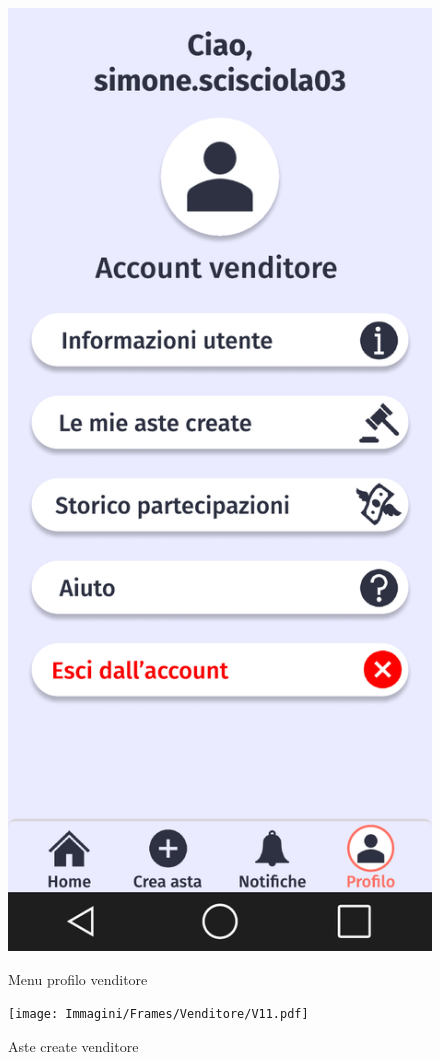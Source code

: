 \begin{figure}[!htb]
\begin{minipage}{0.32\textwidth}
                \includegraphics[width=.7\linewidth]{Immagini/Frames/Venditore/V7.pdf}
                \caption{Menu profilo venditore}
            \end{minipage}\hfill
            \begin{minipage}{0.32\textwidth}
                \centering
                \texttt{[image: Immagini/Frames/Venditore/V11.pdf]}
                \caption{Aste create venditore}
            \end{minipage}\hfill
        \end{figure}
    
